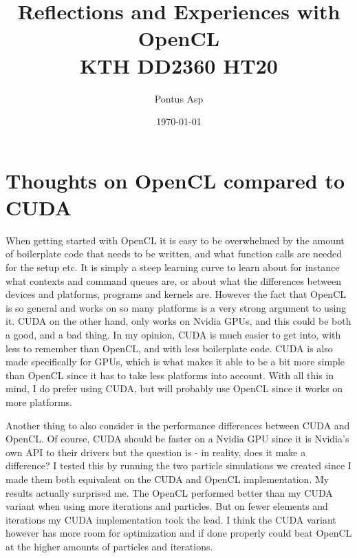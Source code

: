 \documentclass[a4paper, 12pt]{article}
\begin{document}
\title{\vspace{4.0cm}Reflections and Experiences with OpenCL\\
\large KTH DD2360 HT20}
\author{Pontus Asp}
\date{\today}
\maketitle
\thispagestyle{empty}
\newpage

\clearpage
{}


%
%
%
\section{Thoughts on OpenCL compared to CUDA}
When getting started with OpenCL it is easy to be overwhelmed by the amount of boilerplate code that needs to be written, and what function calls are needed for the setup etc. It is simply a steep learning curve to learn about for instance what contexts and command queues are, or about what the differences between devices and platforms, programs and kernels are. However the fact that OpenCL is so general and works on so many platforms is a very strong argument to using it. CUDA on the other hand, only works on Nvidia GPUs, and this could be both a good, and a bad thing. In my opinion, CUDA is much easier to get into, with less to remember than OpenCL, and with less boilerplate code. CUDA is also made specifically for GPUs, which is what makes it able to be a bit more simple than OpenCL since it has to take less platforms into account. With all this in mind, I do prefer using CUDA, but will probably use OpenCL since it works on more platforms.

Another thing to also consider is the performance differences between CUDA and OpenCL. Of course, CUDA should be faster on a Nvidia GPU since it is Nvidia's own API to their drivers but the question is - in reality, does it make a difference? I tested this by running the two particle simulations we created since I made them both equivalent on the CUDA and OpenCL implementation. My results actually surprised me. The OpenCL performed better than my CUDA variant when using more iterations and particles. But on fewer elements and iterations my CUDA implementation took the lead. I think the CUDA variant however has more room for optimization and if done properly could beat OpenCL at the higher amounts of particles and iterations. 

\end{document}
